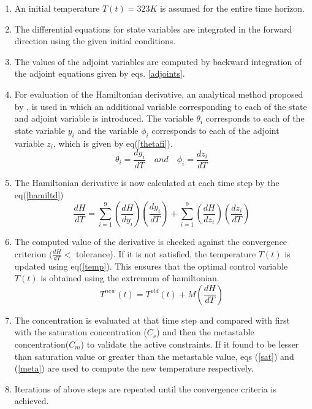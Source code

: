 \documentclass[3p,times,authoryear]{elsarticle}
\begin{document}
\begin{enumerate}
\item An initial temperature $T(t) = 323 K$ is assumed for the entire time horizon.
\item The differential equations for state variables are integrated in the forward direction using the given initial conditions.
\item The values of the adjoint variables are computed by backward integration of the adjoint equations given by eqs. \ref{adjoints}.
\item For evaluation of the Hamiltonian derivative, an analytical method proposed by \cite{benavides}, is used in which an additional variable corresponding to each of the state and adjoint variable is introduced. The variable $\theta_{i}$ corresponds to each of the state variable $y_{i}$ and the variable $\phi_{i}$ corresponds to each of the adjoint variable $z_{i}$, which is given by eq(\ref{thetafi}).
\begin{equation}
\theta_{i} = \frac{dy_{i}}{dT} \quad and \quad \phi_{i} = \frac{dz_{i}}{dT} \label{thetafi} 
\end{equation}
\item The Hamiltonian derivative is now calculated at each time step by the eq(\ref{hamiltd})
\begin{equation}
\frac{dH}{dT} = \sum_{i=1}^{9} \left( \frac{dH}{dy_{i}}\right)\left(	\frac{dy_{i}}{dT} \right) + \sum_{i=1}^{9} \left(\frac{dH}{dz_{i}}\right)\left(\frac{dz_{i}}{dT} \right) \label{hamiltd}
\end{equation}
\item The  computed value of the derivative is checked against the convergence criterion $(\frac{dH}{dT}<$ tolerance). If it is not satisfied, the temperature $T(t)$ is updated using eq(\ref{temp}). This ensures that the optimal control variable $T(t)$ is obtained using the extremum of hamiltonian. 
\begin{equation} 
T^{new}(t) = T^{old}(t) + M\left(\frac{dH}{dT} \right) \label{temp}
\end{equation}
\item The concentration is evaluated  at that time step and compared with first with the saturation concentration ($C_{s}$) and then the metastable concentration($C_{m}$) to validate the active constraints. If it found to be lesser than saturation value or greater than the metastable value, eqs (\ref{sat}) and (\ref{meta}) are used to compute the new temperature respectively. 
\item Iterations of above steps are repeated until the convergence criteria is achieved.
\end{enumerate}
\end{document}
